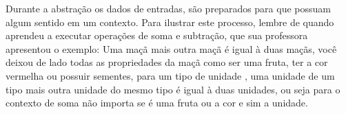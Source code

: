 Durante a abstração os dados de entradas, são preparados para que possuam algum sentido em um contexto. Para ilustrar este processo, lembre de quando aprendeu a executar operações de soma e subtração, que sua professora apresentou o exemplo:
Uma maçã mais outra maçã é igual à duas maçãs, você deixou de lado todas as propriedades da maçã como ser uma fruta, ter a cor vermelha  ou possuir sementes, para um tipo de unidade , uma unidade de um tipo mais outra unidade do mesmo tipo é igual à duas unidades, ou seja para o contexto de soma não importa se é uma fruta ou a cor e sim a unidade.



%
%	
%
%
%
%
%
%

